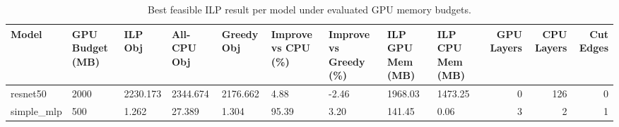 \begin{table}[t]
\centering
\caption{Best feasible ILP result per model under evaluated GPU memory budgets.}
\label{tab:ilp-best-per-model}
\begin{tabular}{lllllllllrrr}
\toprule
Model & GPU Budget (MB) & ILP Obj & All-CPU Obj & Greedy Obj & Improve vs CPU (\%) & Improve vs Greedy (\%) & ILP GPU Mem (MB) & ILP CPU Mem (MB) & GPU Layers & CPU Layers & Cut Edges \\
\midrule
resnet50 & 2000 & 2230.173 & 2344.674 & 2176.662 & 4.88 & -2.46 & 1968.03 & 1473.25 & 0 & 126 & 0 \\
simple_mlp & 500 & 1.262 & 27.389 & 1.304 & 95.39 & 3.20 & 141.45 & 0.06 & 3 & 2 & 1 \\
\bottomrule
\end{tabular}

\end{table}
